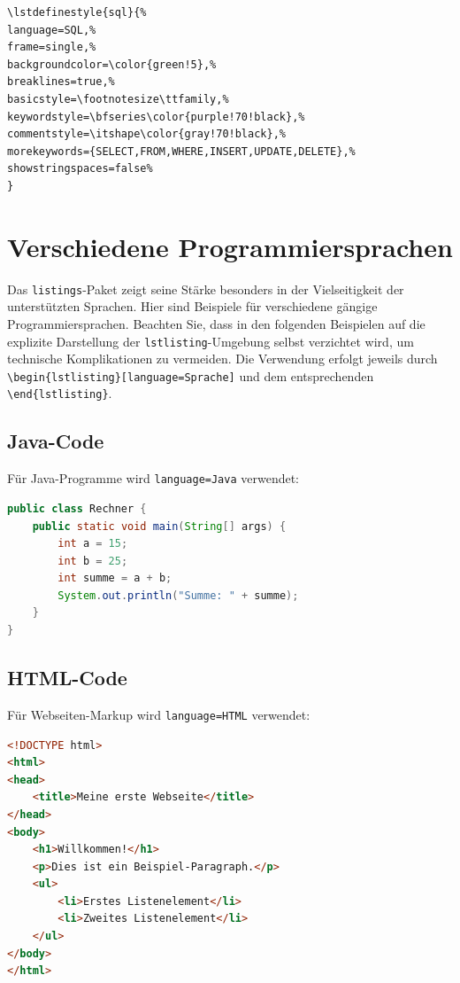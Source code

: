 \begin{lstlisting}[style=latex]
% Stil fuer SQL-Code
\lstdefinestyle{sql}{%
language=SQL,%
frame=single,%
backgroundcolor=\color{green!5},%
breaklines=true,%
basicstyle=\footnotesize\ttfamily,%
keywordstyle=\bfseries\color{purple!70!black},%
commentstyle=\itshape\color{gray!70!black},%
morekeywords={SELECT,FROM,WHERE,INSERT,UPDATE,DELETE},%
showstringspaces=false%
}
\end{lstlisting}



\section{Verschiedene Programmiersprachen}

Das \texttt{listings}-Paket zeigt seine Stärke besonders in der Vielseitigkeit der unterstützten Sprachen. Hier sind Beispiele für verschiedene gängige Programmiersprachen. Beachten Sie, dass in den folgenden Beispielen auf die explizite Darstellung der \texttt{lstlisting}-Umgebung selbst verzichtet wird, um technische Komplikationen zu vermeiden. Die Verwendung erfolgt jeweils durch \texttt{\textbackslash begin\{lstlisting\}[language=Sprache]} und dem entsprechenden \texttt{\textbackslash end\{lstlisting\}}.



\subsection{Java-Code}

Für Java-Programme wird \texttt{language=Java} verwendet:

\begin{lstlisting}[language=Java]
public class Rechner {
    public static void main(String[] args) {
        int a = 15;
        int b = 25;
        int summe = a + b;
        System.out.println("Summe: " + summe);
    }
}
\end{lstlisting}



\subsection{HTML-Code}

Für Webseiten-Markup wird \texttt{language=HTML} verwendet:

\begin{lstlisting}[language=HTML]
<!DOCTYPE html>
<html>
<head>
    <title>Meine erste Webseite</title>
</head>
<body>
    <h1>Willkommen!</h1>
    <p>Dies ist ein Beispiel-Paragraph.</p>
    <ul>
        <li>Erstes Listenelement</li>
        <li>Zweites Listenelement</li>
    </ul>
</body>
</html>
\end{lstlisting}



